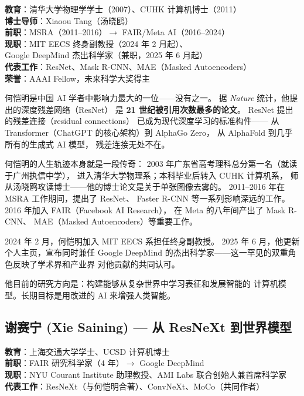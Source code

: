 \begin{keybox}
\textbf{教育}：清华大学物理学学士（2007）、CUHK 计算机博士（2011） \\
\textbf{博士导师}：Xiaoou Tang（汤晓鸥） \\
\textbf{前职}：MSRA（2011--2016）$\to$ FAIR/Meta AI（2016--2024） \\
\textbf{现职}：MIT EECS 终身副教授（2024 年 2 月起）、\\
\quad Google DeepMind 杰出科学家（兼职，2025 年 6 月起） \\
\textbf{代表工作}：ResNet、Mask R-CNN、MAE（Masked Autoencoders）\\
\textbf{荣誉}：AAAI Fellow，未来科学大奖得主
\end{keybox}

何恺明是中国 AI 学者中影响力最大的一位——没有之一。
据 \textit{Nature} 统计，他提出的深度残差网络（ResNet）
是 \textbf{21 世纪被引用次数最多的论文}。
ResNet 提出的残差连接（residual connections）
已成为现代深度学习的标准构件——
从 Transformer（ChatGPT 的核心架构）到 AlphaGo Zero，
从 AlphaFold 到几乎所有的生成式 AI 模型，
残差连接无处不在。

何恺明的人生轨迹本身就是一段传奇：
2003 年广东省高考理科总分第一名（就读于广州执信中学），
进入清华大学物理系；本科毕业后转入 CUHK 计算机系，
师从汤晓鸥攻读博士——他的博士论文是关于单张图像去雾的。
2011--2016 年在 MSRA 工作期间，提出了 ResNet、
Faster R-CNN 等一系列影响深远的工作。
2016 年加入 FAIR（Facebook AI Research），
在 Meta 的八年间产出了 Mask R-CNN、
MAE（Masked Autoencoders）等重要工作。

2024 年 2 月，何恺明加入 MIT EECS 系担任终身副教授。
2025 年 6 月，他更新个人主页，宣布同时兼任 Google DeepMind
的杰出科学家——这一罕见的双重角色反映了学术界和产业界
对他贡献的共同认可。

他目前的研究方向是：构建能够从复杂世界中学习表征和发展智能的
计算机模型。长期目标是用改进的 AI 来增强人类智能。


\subsection{谢赛宁 (Xie Saining) — 从 ResNeXt 到世界模型}

\begin{keybox}
\textbf{教育}：上海交通大学学士、UCSD 计算机博士 \\
\textbf{前职}：FAIR 研究科学家（4 年）$\to$ Google DeepMind \\
\textbf{现职}：NYU Courant Institute 助理教授、AMI Labs 联合创始人兼首席科学家 \\
\textbf{代表工作}：ResNeXt（与何恺明合著）、ConvNeXt、MoCo（共同作者）
\end{keybox}

